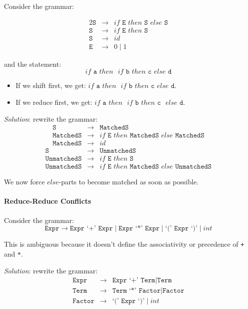 \documentclass[twocolumn,english]{article}
\begin{document}
Consider the grammar:

\begin{alignat*}{2}
\texttt{S} & \rightarrow & if\texttt{ E }then\texttt{ S }else\texttt{ S}\\
\texttt{S} & \rightarrow & if\texttt{ E }then\texttt{ S}\\
\texttt{S} & \rightarrow & id\\
\texttt{E} & \rightarrow & 0\mid1
\end{alignat*}

and the statement:
\[
if\texttt{ a }then\texttt{ }if\texttt{ b }then\texttt{ c }else\texttt{ d}
\]
\begin{itemize}
\item If we shift first, we get: $if\texttt{ a }then\texttt{ }\boxed{if\texttt{ b }then\texttt{ c }else\texttt{ d}}$.
\item If we reduce first, we get: $if\texttt{ a }then\texttt{ }\boxed{if\texttt{ b }then\texttt{ c}}\texttt{ }else\texttt{ d}$.
\end{itemize}
\emph{Solution}: rewrite the grammar:
\begin{align*}
\texttt{S} & \rightarrow & \texttt{MatchedS}\\
\texttt{MatchedS} & \rightarrow & if\texttt{ E }then\texttt{ MatchedS }else\texttt{ MatchedS}\\
\texttt{MatchedS} & \rightarrow & id
\end{align*}
\begin{align*}
\texttt{S} & \rightarrow & \texttt{UnmatchedS}\\
\texttt{UnmatchedS} & \rightarrow & if\texttt{ E }then\texttt{ S}\\
\texttt{UnmatchedS} & \rightarrow & if\texttt{ E }then\texttt{ MatchedS }else\texttt{ UnmatchedS}
\end{align*}

We now force $else$-parts to become matched as soon as possible.

\paragraph{Reduce-Reduce Conflicts}

Consider the grammar:
\[
\texttt{Expr}\rightarrow\texttt{Expr `+' Expr}\mid\texttt{Expr `*' Expr}\mid\texttt{`(' Expr `)'}\mid int
\]

This is ambiguous because it doesn't define the associativity or precedence
of \texttt{+} and \texttt{{*}}.

\emph{Solution}: rewrite the grammar:
\begin{align*}
\texttt{Expr} & \rightarrow & \texttt{Expr `+' Term}\mid\texttt{Term}\\
\texttt{Term} & \rightarrow & \texttt{Term `*' Factor}\mid\texttt{Factor}\\
\texttt{Factor} & \rightarrow & \texttt{`(' Expr `)'}\mid int
\end{align*}
\end{document}
